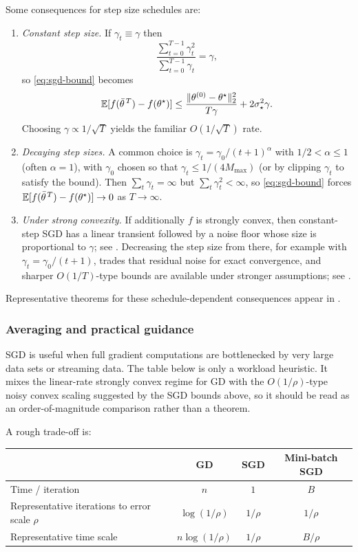 Some consequences for step size schedules are:
\begin{enumerate}[leftmargin=*,label=(\arabic*)]
  \item \emph{Constant step size.} If $\gamma_t\equiv \gamma$ then
  \[
    \frac{\sum_{t=0}^{T-1}\gamma_t^2}{\sum_{t=0}^{T-1}\gamma_t}=\gamma,
  \]
  so \eqref{eq:sgd-bound} becomes
  \[
    \mathbb{E}[f(\bar\theta^{\,T})-f(\theta^\star)]
    \le \frac{\lVert\theta^{(0)}-\theta^\star\rVert_2^2}{T\gamma} + 2\sigma_\star^2 \gamma.
  \]
  Choosing $\gamma \propto 1/\sqrt{T}$ yields the familiar $O(1/\sqrt{T})$ rate.

  \item \emph{Decaying step sizes.} A common choice is $\gamma_t=\gamma_0/(t+1)^\alpha$ with $1/2<\alpha\le 1$ (often $\alpha=1$), with $\gamma_0$ chosen so that $\gamma_t \le 1/(4M_{\max})$ (or by clipping $\gamma_t$ to satisfy the bound).
  Then $\sum_t \gamma_t = \infty$ but $\sum_t \gamma_t^2 < \infty$, so \eqref{eq:sgd-bound} forces $\mathbb{E}[f(\bar\theta^{\,T})-f(\theta^\star)]\to 0$ as $T\to\infty$.

  \item \emph{Under strong convexity.} If additionally $f$ is strongly convex, then constant-step SGD has a linear transient followed by a noise floor whose size is proportional to $\gamma$; see \citet[Thm.~5.8]{garrigos_gower_2024_handbook}. Decreasing the step size from there, for example with $\gamma_t=\gamma_0/(t+1)$, trades that residual noise for exact convergence, and sharper $O(1/T)$-type bounds are available under stronger assumptions; see \citet[\S5.2]{garrigos_gower_2024_handbook}.
\end{enumerate}
Representative theorems for these schedule-dependent consequences appear in \citet[Thm.~5.3 and \S5.2]{garrigos_gower_2024_handbook}.

\subsubsection{Averaging and practical guidance}
\label{subsubsec:sgd-practical-guidance}

SGD is useful when full gradient computations are bottlenecked by very large data sets or streaming data.
The table below is only a workload heuristic.
It mixes the linear-rate strongly convex regime for GD with the $O(1/\rho)$-type noisy convex scaling suggested by the SGD bounds above, so it should be read as an order-of-magnitude comparison rather than a theorem.
\medskip

A rough trade-off is:
\begin{center}
\begin{tabular}{@{}lccc@{}}
\toprule
& GD & SGD & Mini-batch SGD \\
\midrule
Time / iteration & $n$ & $1$ & $B$ \\
Representative iterations to error scale $\rho$ & $\log(1/\rho)$ & $1/\rho$ & $1/\rho$ \\
Representative time scale & $n\log(1/\rho)$ & $1/\rho$ & $B/\rho$ \\
\bottomrule
\end{tabular}
\end{center}

